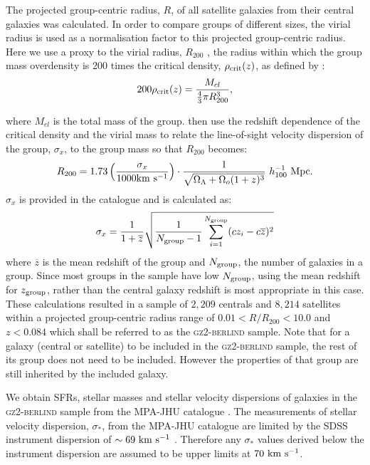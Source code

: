\documentclass[useAMS,usenatbib]{mn2e}
\begin{document}
The projected group-centric radius, $R$, of all satellite galaxies from their central galaxies was calculated. In order to compare groups of different sizes, the virial radius is used as a normalisation factor to this projected group-centric radius. Here we use a proxy to the virial radius, $R_{200}$ \citep[see][]{navarro95}, the radius within which the group mass overdensity is 200 times the critical density, $\rho_{\rm{crit}}(z)$, as defined by \citealt{finn05}:
\begin{equation}\label{eq:overdense}
200\rho_{\rm{crit}}(z) = \frac{M_{cl}}{\frac{4}{3}\pi R_{200}^3},
\end{equation}

where $M_{cl}$ is the total mass of the group. \citeauthor{finn05} then use the redshift dependence of the critical density and the virial mass to relate the line-of-sight velocity dispersion of the group, $\sigma_x$, to the group mass so that $R_{200}$ becomes:
\begin{equation}\label{eq:r200}
R_{200} = 1.73 \left ( \frac{\sigma_x}{1000 \rm{km}~\rm{s}^{-1}} \right) \cdot \frac{1}{\sqrt{\Omega_{\Lambda} +\Omega_o(1+z)^3}} ~ h_{100}^{-1} ~\rm{Mpc}. 
\end{equation}
$\sigma_x$ is provided in the \cite{berlind06} catalogue and is calculated as:
\begin{equation}
\sigma_x = \frac{1}{1+\overline{z}} \sqrt{\frac{1}{N_{\rm{group}}-1} \sum_{i=1}^{N_{\rm{group}}}(cz_i - c\overline{z})^2}
\end{equation}
where $\overline{z}$ is the mean redshift of the group and $N_{\rm{group}}$, the number of galaxies in a group. Since most groups in the sample have low $N_{\rm{group}}$, using the mean redshift for $z_{\rm{group}}$, rather than the central galaxy redshift is most appropriate in this case. These calculations resulted in a sample of $2,209$ centrals and $8,214$ satellites within a projected group-centric radius range of $0.01 < R/R_{200} < 10.0$ and $z < 0.084$ which shall be referred to as the \textsc{gz2-berlind} sample. Note that for a galaxy (central or satellite) to be included in the \textsc{gz2-berlind} sample, the rest of its group does not need to be included. However the properties of that group are still inherited by the included galaxy. 

We obtain SFRs, stellar masses and stellar velocity dispersions of galaxies in the \textsc{gz2-berlind} sample from the MPA-JHU catalogue \citep{kauffmann03, brinchmann04}. The measurements of stellar velocity dispersion, $\sigma_*$, from the MPA-JHU catalogue are limited by the SDSS instrument dispersion of $\sim69~\rm{km}~\rm{s}^{-1}$ \citep{stoughton02}. Therefore any $\sigma_*$ values derived below the instrument dispersion are assumed to be upper limits at $70~\rm{km}~\rm{s}^{-1}$. 
\end{document}
